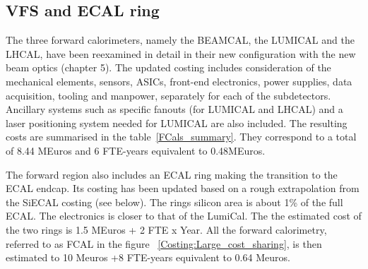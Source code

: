 
\subsection{VFS and ECAL ring}

The three forward calorimeters, namely the BEAMCAL, the LUMICAL and the LHCAL, have been reexamined in detail in their new configuration with the new beam optics (chapter 5). The updated costing includes consideration of the mechanical elements, sensors, ASICs, front-end electronics, power supplies, data acquisition, tooling and manpower, separately for each of the subdetectors. Ancillary systems such as specific fanouts (for LUMICAL and LHCAL) and a laser positioning system needed for LUMICAL are also included. The resulting costs are summarised in the table~\ref{FCals_summary}. They correspond to a total of 8.44 MEuros and 6 FTE-years equivalent to 0.48MEuros.


The forward region also includes an ECAL ring making the transition to the ECAL endcap. Its costing has been updated based on a rough extrapolation from the SiECAL costing (see below). The rings silicon area is about  1\% of the full ECAL. The electronics is closer to that of the LumiCal.  The the estimated cost of the two rings is 1.5 MEuros + 2 FTE x Year.  All the forward calorimetry, referred to as FCAL in the figure ~\ref{Costing:Large_cost_sharing}, is then estimated to 10 Meuros +8 FTE-years equivalent to 0.64 Meuros.


